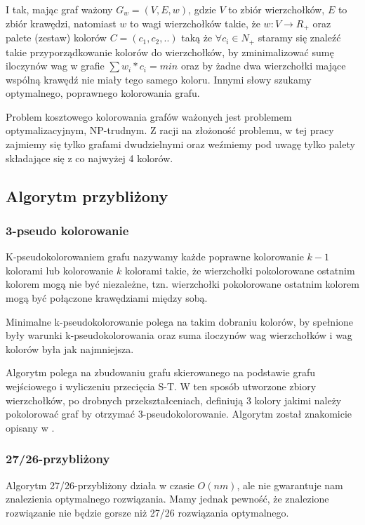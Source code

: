 \documentclass{article}
\begin{document}
I tak, mając graf ważony $G_w = (V,E,w)$, gdzie $V$ to zbiór wierzchołków, $E$ to zbiór krawędzi, natomiast $w$ to wagi wierzchołków takie, że  $w:V \rightarrow R_+$ oraz palete (zestaw) kolorów $C = (c_1, c_2, ..)$ taką że $\forall c_i \in N_+$ staramy się znaleźć takie przyporządkowanie kolorów do wierzchołków, by zminimalizować sumę iloczynów wag w grafie $\sum w_i * c_i = min$ oraz by żadne dwa wierzchołki mające wspólną krawędź nie miały tego samego koloru. Innymi słowy szukamy optymalnego, poprawnego kolorowania grafu.

Problem kosztowego kolorowania grafów ważonych jest problemem optymalizacyjnym, NP-trudnym. Z racji na złożoność problemu, w tej pracy zajmiemy się tylko grafami dwudzielnymi oraz weźmiemy pod uwagę tylko palety składające się z co najwyżej 4 kolorów.

\subsection{Algorytm przybliżony}

\subsubsection*{3-pseudo kolorowanie}

K-pseudokolorowaniem grafu nazywamy każde poprawne kolorowanie $k-1$ kolorami lub kolorowanie $k$ kolorami takie, że wierzchołki pokolorowane ostatnim kolorem mogą nie być niezależne, tzn. wierzchołki pokolorowane ostatnim kolorem mogą być połączone krawędziami między sobą. 

Minimalne k-pseudokolorowanie polega na takim dobraniu kolorów, by spełnione były warunki k-pseudokolorowania oraz suma iloczynów wag wierzchołków i wag kolorów była jak najmniejsza.

Algorytm polega na zbudowaniu grafu skierowanego na podstawie grafu wejściowego i wyliczeniu przecięcia S-T. W ten sposób utworzone zbiory wierzchołków, po drobnych przekształceniach, definiują 3 kolory jakimi należy pokolorować graf by otrzymać 3-pseudokolorowanie. Algorytm został znakomicie opisany w \cite{kubale-pikies19}.

\subsubsection*{27/26-przybliżony}

Algorytm 27/26-przybliżony działa w czasie $O(nm)$, ale nie gwarantuje nam znalezienia optymalnego rozwiązania. Mamy jednak pewność, że znalezione rozwiązanie nie będzie gorsze niż 27/26 rozwiązania optymalnego. 
\end{document}

